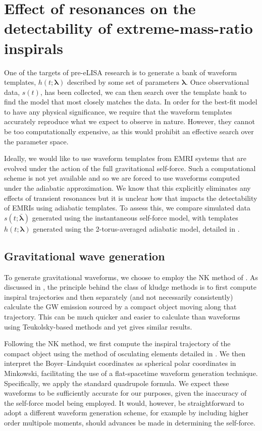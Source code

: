 \chapter[Effect of resonances on the detectability of EMRIs]{Effect of resonances on the detectability of extreme-mass-ratio inspirals}\label{ch:effect-resonances}

One of the targets of pre-eLISA research is to generate a bank of waveform templates, $h(t;\boldsymbol{\lambda})$ described by some set of parameters $\boldsymbol{\lambda}$. Once observational data, $s(t)$, has been collected, we can then search over the template bank to find the model that most closely matches the data. In order for the best-fit model to have any physical significance, we require that the waveform templates accurately reproduce what we expect to observe in nature. However, they cannot be too computationally expensive, as this would prohibit an effective search over the parameter space.

Ideally, we would like to use waveform templates from EMRI systems that are evolved under the action of the full gravitational self-force. Such a computational scheme is not yet available and so we are forced to use waveforms computed under the adiabatic approximation. We know that this explicitly eliminates any effects of transient resonances but it is unclear how that impacts the detectability of EMRIs using adiabatic templates. To assess this, we compare simulated data $s(t;\bar{\boldsymbol{\lambda}})$ generated using the instantaneous self-force model, with templates $h(t;\boldsymbol{\lambda})$ generated using the 2-torus-averaged adiabatic model, detailed in .

\section{Gravitational wave generation}
To generate gravitational waveforms, we choose to employ the NK method of \citet{babak_kludge_2007}. As discussed in , the principle behind the class of kludge methods is to first compute inspiral trajectories and then separately (and not necessarily consistently) calculate the GW emission sourced by a compact object moving along that trajectory. This can be much quicker and easier to calculate than waveforms using Teukolsky-based methods and yet gives similar results.

Following the NK method, we first compute the inspiral trajectory of the compact object using the method of osculating elements detailed in . We then interpret the Boyer--Lindquist coordinates as spherical polar coordinates in Minkowski, facilitating the use of a flat-spacetime waveform generation technique. Specifically, we apply the standard quadrupole formula. We expect these waveforms to be sufficiently accurate for our purposes, given the inaccuracy of the self-force model being employed. It would, however, be straightforward to adopt a different waveform generation scheme, for example by including higher order multipole moments, should advances be made in determining the self-force.

